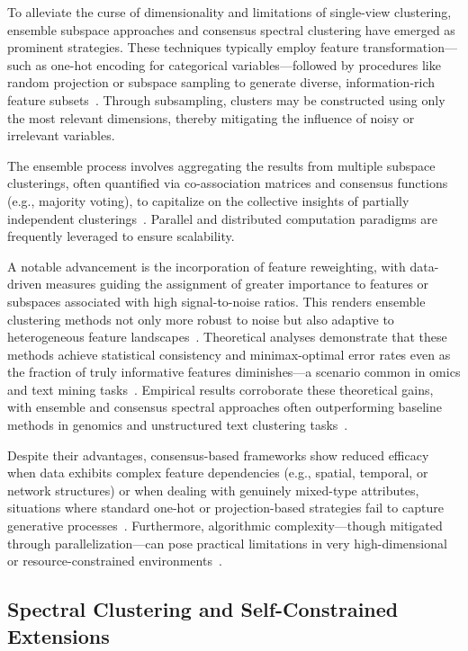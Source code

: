 \documentclass[sigconf]{acmart}
\begin{document}
To alleviate the curse of dimensionality and limitations of single-view clustering, ensemble subspace approaches and consensus spectral clustering have emerged as prominent strategies. These techniques typically employ feature transformation—such as one-hot encoding for categorical variables—followed by procedures like random projection or subspace sampling to generate diverse, information-rich feature subsets~\cite{ref96,ref116}. Through subsampling, clusters may be constructed using only the most relevant dimensions, thereby mitigating the influence of noisy or irrelevant variables.

The ensemble process involves aggregating the results from multiple subspace clusterings, often quantified via co-association matrices and consensus functions (e.g., majority voting), to capitalize on the collective insights of partially independent clusterings~\cite{ref97,ref101}. Parallel and distributed computation paradigms are frequently leveraged to ensure scalability.

A notable advancement is the incorporation of feature reweighting, with data-driven measures guiding the assignment of greater importance to features or subspaces associated with high signal-to-noise ratios. This renders ensemble clustering methods not only more robust to noise but also adaptive to heterogeneous feature landscapes~\cite{ref99,ref116}. Theoretical analyses demonstrate that these methods achieve statistical consistency and minimax-optimal error rates even as the fraction of truly informative features diminishes—a scenario common in omics and text mining tasks~\cite{ref96,ref116}. Empirical results corroborate these theoretical gains, with ensemble and consensus spectral approaches often outperforming baseline methods in genomics and unstructured text clustering tasks~\cite{ref116}.

Despite their advantages, consensus-based frameworks show reduced efficacy when data exhibits complex feature dependencies (e.g., spatial, temporal, or network structures) or when dealing with genuinely mixed-type attributes, situations where standard one-hot or projection-based strategies fail to capture generative processes~\cite{ref116}. Furthermore, algorithmic complexity—though mitigated through parallelization—can pose practical limitations in very high-dimensional or resource-constrained environments~\cite{ref116}.

\subsection{Spectral Clustering and Self-Constrained Extensions}
\end{document}
